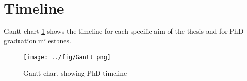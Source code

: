\documentclass[defaultstyle,11pt]{thesis}
\begin{document}
\hypertarget{timeline}{%
\section{Timeline}\label{timeline}}

Gantt chart \ref{fig:Gantt} shows the timeline for each specific aim of the thesis and for PhD graduation milestones.

\begin{figure}
\hypertarget{fig:Gantt}{%
\centering
\texttt{[image: ../fig/Gantt.png]}
\caption{Gantt chart showing PhD timeline}\label{fig:Gantt}
}
\end{figure}



\appendix


\end{document}
